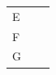{\begin{tabular}[t]{|l|l|l|}
     \tabularnewline\cline{1-1}\cline{2-2}\cline{3-3}
    
    
        E &
    
    
         &
    
    
     \tabularnewline\cline{1-1}\cline{2-2}\cline{3-3}
    
    
        F &
    
    
         &
    
    
     \tabularnewline\cline{1-1}\cline{2-2}\cline{3-3}
    
    
        G &
    

\end{tabular}}
